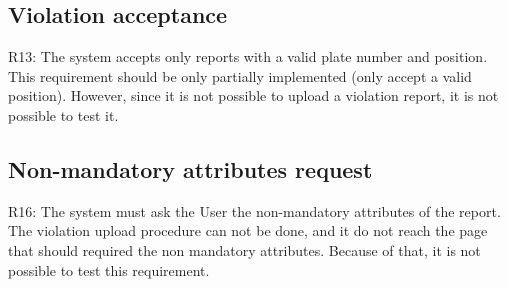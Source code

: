 \documentclass[../ATD.tex]{subfiles}
\begin{document}
    \subsection{Violation acceptance}\label{subsec:violation-acceptance}
    R13: The system accepts only reports with a valid plate number and position.
    \newline
    This requirement should be only partially implemented (only accept a valid position).
    However, since it is not possible to upload a violation report, it is not possible to test it.

    \subsection{Non-mandatory attributes request}\label{subsec:non-mandatory-attribure-request}
    R16: The system must ask the User the non-mandatory attributes of the report.
    \newline
    The violation upload procedure can not be done, and it do not reach the page that should required the non mandatory attributes.
    Because of that, it is not possible to test this requirement.
\end{document}
